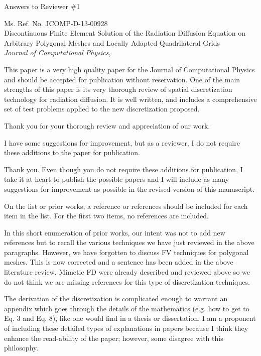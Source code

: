\documentclass{article}
\begin{document}
\begin{center}
{ \Large Answers to Reviewer \#1}
\end{center}

\bigskip

\noindent Ms. Ref. No. JCOMP-D-13-00928\\
Discontinuous Finite Element Solution of the Radiation Diffusion Equation on Arbitrary Polygonal Meshes and Locally Adapted Quadrilateral Grids\\
{\it Journal of Computational Physics},\\

\bigskip
\bigskip

{
\color{blue}
This paper is a very high quality paper for the Journal of Computational Physics and should be
accepted for publication without reservation. One of the main strengths of this paper is its very thorough
review of spatial discretization technology for radiation diffusion. It is well written, and includes a
comprehensive set of test problems applied to the new discretization proposed.
}

Thank you for your thorough review and appreciation of our work. 
\bigskip


{
\color{blue}
I have some suggestions for improvement, but as a reviewer, I do not require these additions to the paper
for publication.
}


Thank you. Even though you do not require these additions for publication, I take it at heart to publish the 
possible papers and I will include as many suggestions for improvement as possible in the revised version of 
this manuscript.
\bigskip



{
\color{blue}
On the list or prior works, a reference or references should be included for each item in the list. For the
first two items, no references are included.
}

In this short enumeration of prior works, our intent was not to add new references but to recall
the various techniques we have just reviewed in the above paragraphs. However, we have forgotten to 
discuss FV techniques for polygonal meshes. This is now corrected and a sentence has been added in the 
above literature review. Mimetic FD were already described and reviewed above so we do not think we are missing 
references for this type of discretization techniques. 
\bigskip

{
\color{blue}
The derivation of the discretization is complicated enough to warrant an appendix which goes through
the details of the mathematics (e.g. how to get to Eq. 3 and Eq. 8), like one would find in a thesis or
dissertation. I am a proponent of including these detailed types of explanations in papers because I think
they enhance the read-ability of the paper; however, some disagree with this philosophy.
}
\end{document}
